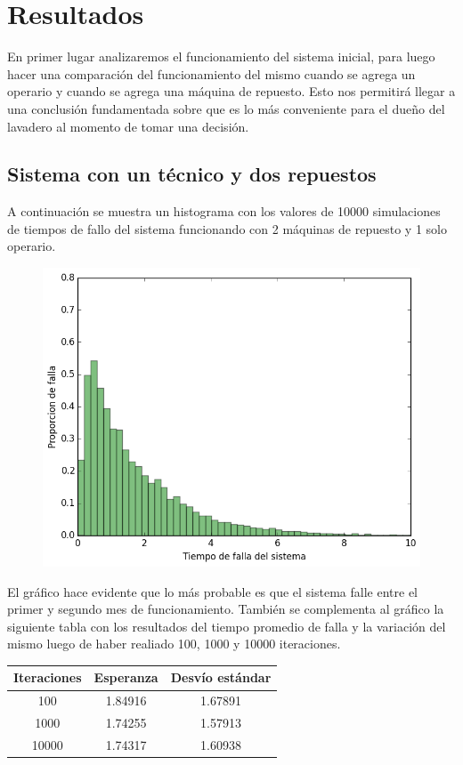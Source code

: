 \documentclass[10pt,a4paper]{article} %
\begin{document}
    \newpage
    \section{Resultados}
    En primer lugar analizaremos el funcionamiento del sistema inicial, para luego hacer una comparaci\'on del funcionamiento del mismo cuando se agrega un operario y cuando se agrega una m\'aquina de repuesto. Esto nos permitir\'a llegar a una conclusi\'on fundamentada sobre que es lo m\'as conveniente para el due\~no del lavadero al momento de tomar una decisi\'on.
    
    \subsection{Sistema con un t\'ecnico y dos repuestos}
    A continuaci\'on se muestra un histograma con los valores de 10000 simulaciones de tiempos de fallo del sistema funcionando con 2 m\'aquinas de repuesto y 1 solo operario.
    \begin {figure}[!htb]
    \centering
    \includegraphics[width=12cm] {img/1op2rep}
    \end {figure}
    
    El gr\'afico hace evidente que lo m\'as probable es que el sistema falle entre el primer y segundo mes de funcionamiento. Tambi\'en se complementa al gr\'afico la siguiente tabla con los resultados del tiempo promedio de falla y la variaci\'on del mismo luego de haber realiado 100, 1000 y 10000 iteraciones.
    
    \begin{center}
        \begin{tabular}{ c| c| c}
            Iteraciones & Esperanza & Desv\'io est\'andar \\ \hline
            100&    1.84916 & 1.67891 \\ \hline
            1000&   1.74255 & 1.57913 \\ \hline
            10000&  1.74317 & 1.60938 \\ \hline
        \end{tabular}
    \end{center}
    
\end{document}
